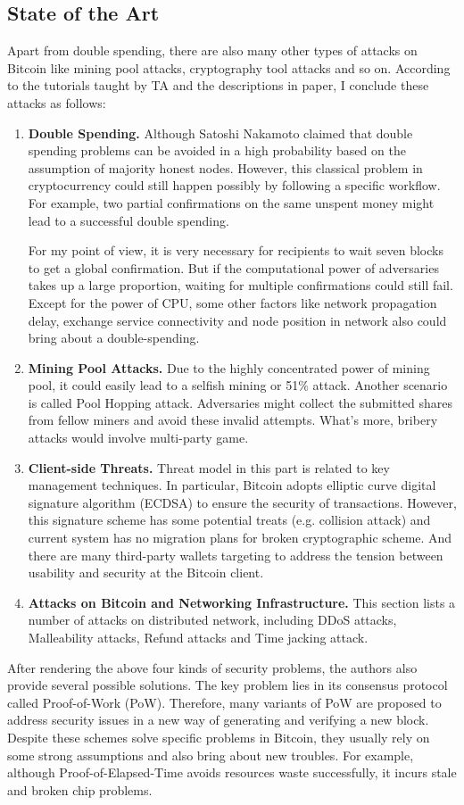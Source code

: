 \documentclass[conference]{IEEEtran}
\begin{document}
\subsection{State of the Art}
Apart from double spending, there are also many other types of attacks on Bitcoin like mining pool attacks, cryptography tool attacks and so on.
%
According to the tutorials taught by TA and the descriptions in paper, I conclude these attacks as follows:
%
\begin{enumerate}[label=(\roman*)]
   \item  \textbf{Double Spending.} Although Satoshi Nakamoto claimed that double spending problems can be avoided in a high probability based on the assumption of majority honest nodes.
   However, this classical problem in cryptocurrency could still happen possibly by following a specific workflow.
   For example, two partial confirmations on the same unspent money might lead to a successful double spending. 
   
   For my point of view, it is very necessary for recipients to wait seven blocks to get a global confirmation.
   But if the computational power of adversaries takes up a large proportion, waiting for multiple confirmations could still fail.
   Except for the power of CPU, some other factors like network propagation delay, exchange service connectivity and node position in network also could bring about a double-spending.
   \item  \textbf{Mining Pool Attacks.} Due to the highly concentrated power of mining pool, it could easily lead to a selfish mining or 51$\%$ attack.
   Another scenario is called Pool Hopping attack. Adversaries might collect the submitted shares from fellow miners and avoid these invalid attempts.
   What's more, bribery attacks would involve multi-party game.
   \item \textbf{Client-side Threats.} Threat model in this part is related to key management techniques.
   In particular, Bitcoin adopts elliptic curve digital signature algorithm (ECDSA) to ensure the security of transactions.
   However, this signature scheme has some potential treats (e.g. collision attack) and current system has no migration plans for broken cryptographic scheme.
   And there are many third-party wallets targeting to address the tension between usability and security at the Bitcoin client.  
   \item \textbf{Attacks on Bitcoin and Networking Infrastructure.} 
   This section lists a number of attacks on distributed network, including DDoS attacks, Malleability attacks, Refund attacks and Time jacking attack.
\end{enumerate}
%
After rendering the above four kinds of security problems, the authors also provide several possible solutions. 
%
The key problem lies in its consensus protocol called Proof-of-Work (PoW). 
%
Therefore, many variants of PoW are proposed to address security issues in a new way of generating and verifying a new block.
%
Despite these schemes solve specific problems in Bitcoin, they usually rely on some strong assumptions and also bring about new troubles.
%
For example, although Proof-of-Elapsed-Time avoids resources waste successfully, it incurs stale and broken chip problems.
\end{document}
